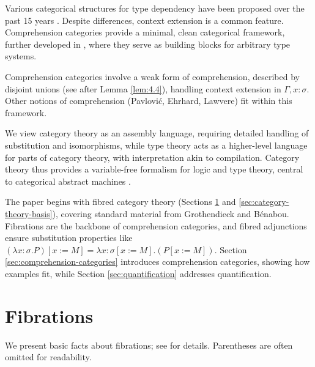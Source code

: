 \documentclass{article}
\theoremstyle{plain}
\theoremstyle{remark}
\begin{document}
Various categorical structures for type dependency have been proposed over the past 15 years \cite{Cartmell1978, Seely1984, Taylor1986, Lamarche1988, HylandPitts1989, Moggi1991, Pavlovic1990}. Despite differences, context extension is a common feature. Comprehension categories provide a minimal, clean categorical framework, further developed in \cite{Jacobs1991, JacobsMoggiStreicher1991}, where they serve as building blocks for arbitrary type systems.

Comprehension categories involve a weak form of comprehension, described by disjoint unions (see after Lemma \ref{lem:4.4}), handling context extension in $\Gamma, x : \sigma$. Other notions of comprehension (Pavlović, Ehrhard, Lawvere) fit within this framework.

We view category theory as an assembly language, requiring detailed handling of substitution and isomorphisms, while type theory acts as a higher-level language for parts of category theory, with interpretation akin to compilation. Category theory thus provides a variable-free formalism for logic and type theory, central to categorical abstract machines \cite{Curien1986, Curien1989}.

The paper begins with fibred category theory (Sections \ref{sec:fibrations} and \ref{sec:category-theory-basis}), covering standard material from Grothendieck and Bénabou. Fibrations are the backbone of comprehension categories, and fibred adjunctions ensure substitution properties like $(\lambda x : \sigma . P)[x := M] = \lambda x : \sigma[x := M] . (P[x := M])$. Section \ref{sec:comprehension-categories} introduces comprehension categories, showing how examples fit, while Section \ref{sec:quantification} addresses quantification.

\section{Fibrations}
\label{sec:fibrations}

We present basic facts about fibrations; see \cite{Benabou1985, Giraud1971, Gray1966, Grothendieck1971} for details. Parentheses are often omitted for readability.
\end{document}
